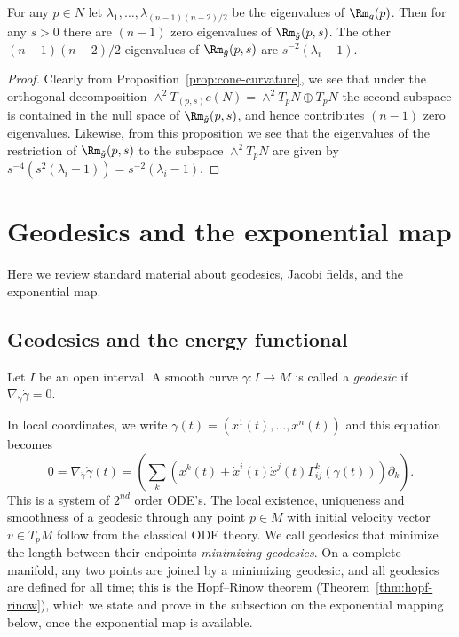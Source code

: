 \begin{corollary}
\label{cor:cone-eigenvalues}

For any $p\in N$ let $\lambda_1,\ldots,\lambda_{(n-1)(n-2)/2}$ be
the eigenvalues of $\Rm_g(p)$. Then for any $s>0$  there are
$(n-1)$ zero eigenvalues of $\Rm_{\tilde g}(p,s)$. The other
$(n-1)(n-2)/2$ eigenvalues of $\Rm_{\tilde g}(p,s)$ are
$s^{-2}(\lambda_i-1)$.
\end{corollary}


\begin{proof}
\sketch
{}
Clearly from Proposition~\ref{prop:cone-curvature}, we see that under the
orthogonal decomposition $\wedge^2T_{(p,s)}c(N)=\wedge^2T_pN\oplus
T_pN$ the second subspace is contained in the null space of $ \Rm_{\tilde g}(p,s)$, and hence contributes $(n-1)$ zero
eigenvalues. Likewise, from this proposition we see that the
eigenvalues of the restriction of $\Rm_{\tilde g}(p,s)$ to the
subspace $\wedge^2T_pN$ are  given by
$s^{-4}(s^2(\lambda_i-1))=s^{-2}(\lambda_i-1)$.
\end{proof}


\section{Geodesics and the exponential map}

Here we review standard material about geodesics, Jacobi fields, and
the exponential map.

\subsection{Geodesics and the energy functional}

\begin{definition}[Geodesic]
\label{def:geodesic}
\leanok



 Let $I$ be an open interval.
A smooth curve $\gamma\colon I \rightarrow M$ is called a
\textit{geodesic} if $\nabla_{\dot \gamma}\dot
\gamma =0$.
\end{definition}

In local coordinates, we write $\gamma(t)=(x^1(t),\ldots,x^n(t))$
and this equation becomes
$$0=\nabla_{\dot \gamma}\dot \gamma(t) =
\left(\sum\limits_k\left(\ddot x^k(t) +\dot x^i(t)\dot
x^j(t)\Gamma^{k}_{ij}(\gamma(t))\right)\partial_k\right).$$ This is
a system of $2^{nd}$ order ODE's. The local existence, uniqueness
and smoothness of a geodesic through any point $p\in M$ with initial
velocity vector $v\in T_pM$ follow from the classical ODE theory.
We call geodesics that minimize the length between their endpoints
{\em minimizing geodesics}. On a complete manifold, any two points
are joined by a minimizing geodesic, and all geodesics are defined
for all time; this is the Hopf--Rinow theorem
(Theorem~\ref{thm:hopf-rinow}), which we state and prove in the
subsection on the exponential mapping below, once the exponential
map is available.



